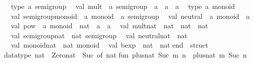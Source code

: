 \begin{isabellebody}
\begin{isamarkuptext}
\ \ type\ {}a\ semigroup\isanewline
\ \ val\ mult\ {}\ {}a\ semigroup\ {}{}\ {}a\ {}{}\ {}a\ {}{}\ {}a\isanewline
\ \ type\ {}a\ monoid\isanewline
\ \ val\ semigroup{}monoid\ {}\ {}a\ monoid\ {}{}\ {}a\ semigroup\isanewline
\ \ val\ neutral\ {}\ {}a\ monoid\ {}{}\ {}a\isanewline
\ \ val\ pow\ {}\ {}a\ monoid\ {}{}\ nat\ {}{}\ {}a\ {}{}\ {}a\isanewline
\ \ val\ mult{}nat\ {}\ nat\ {}{}\ nat\ {}{}\ nat\isanewline
\ \ val\ semigroup{}nat\ {}\ nat\ semigroup\isanewline
\ \ val\ neutral{}nat\ {}\ nat\isanewline
\ \ val\ monoid{}nat\ {}\ nat\ monoid\isanewline
\ \ val\ bexp\ {}\ nat\ {}{}\ nat\isanewline
end\ {}\ struct\isanewline
\isanewline
datatype\ nat\ {}\ Zero{}nat\ {}\ Suc\ of\ nat{}\isanewline
\isanewline
fun\ plus{}nat\ {}Suc\ m{}\ n\ {}\ plus{}nat\ m\ {}Suc\ n{}\isanewline

\end{isamarkuptext}
\end{isabellebody}
